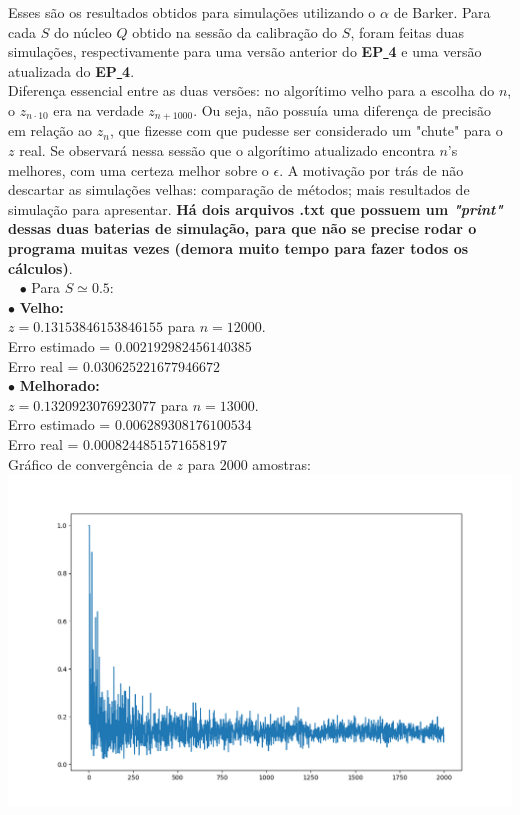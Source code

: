 \documentclass[pt12]{article}
\begin{document}
Esses são os resultados obtidos para simulações utilizando o $\alpha$ de Barker. Para cada $S$ do núcleo $Q$ obtido na sessão da calibração do $S$, foram feitas duas simulações, respectivamente para uma versão anterior do \textbf{EP\underline{ }4} e uma versão atualizada do \textbf{EP\underline{ }4}.\\
Diferença essencial entre as duas versões: no algorítimo velho para a escolha do $n$, o $z_{n\cdot 10}$ era na verdade $z_{n+1000}$. Ou seja, não possuía uma diferença de precisão em relação ao $z_{n}$, que fizesse com que pudesse ser considerado um "chute" para o $z$ real. Se observará nessa sessão que o algorítimo atualizado encontra $n$'s melhores, com uma certeza melhor sobre o $\epsilon$. A motivação por trás de não descartar as simulações velhas: comparação de métodos; mais resultados de simulação para apresentar. \textbf{Há dois arquivos .txt que possuem um \textit{"print"} dessas duas baterias de simulação, para que não se precise rodar o programa muitas vezes (demora muito tempo para fazer todos os cálculos)}.\\
\ 
\newpage
\indent $\bullet$ Para $S \simeq 0.5$:\\

\indent \indent $\bullet$ \textbf{Velho:}\\

\indent \indent $z  = 0.13153846153846155$ para $n = 12000$.\\
\indent \indent Erro estimado = $0.002192982456140385$\\
\indent \indent Erro real = $0.030625221677946672$\\

\indent \indent $\bullet$ \textbf{Melhorado:}\\

\indent \indent $z  = 0.1320923076923077$ para $n = 13000$.\\
\indent \indent Erro estimado = $0.006289308176100534$\\
\indent \indent Erro real = $0.0008244851571658197$\\

\indent \indent Gráfico de convergência de $z$ para $2000$ amostras:\\

\includegraphics[scale=0.4]{ConvergZ_B_1.png}
\end{document}
